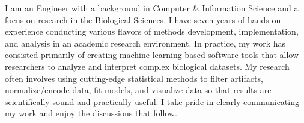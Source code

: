 \documentclass[letterpaper,10pt]{article}
\newcommand{\personalstatement}[1]{
  \begin{center}
  \begin{minipage}[t]{0.96\textwidth}
    \linespread{0.90}\selectfont
    \vspace{.1cm}\small{
      #1 \vspace{1pt}
    }
  \end{minipage}
  \end{center}
}
\begin{document}
\personalstatement{

I am an Engineer with a background in Computer \& Information Science and a focus on research in the Biological Sciences. I have seven years of hands-on experience conducting various flavors of methods development, implementation, and analysis in an academic research environment. In practice, my work has consisted primarily of creating machine learning-based software tools that allow researchers to analyze and interpret complex biological datasets. My research often involves using cutting-edge statistical methods to filter artifacts, normalize/encode data, fit models, and visualize data so that results are scientifically sound and practically useful. I take pride in clearly communicating my work and enjoy the discussions that follow.



}
\end{document}
